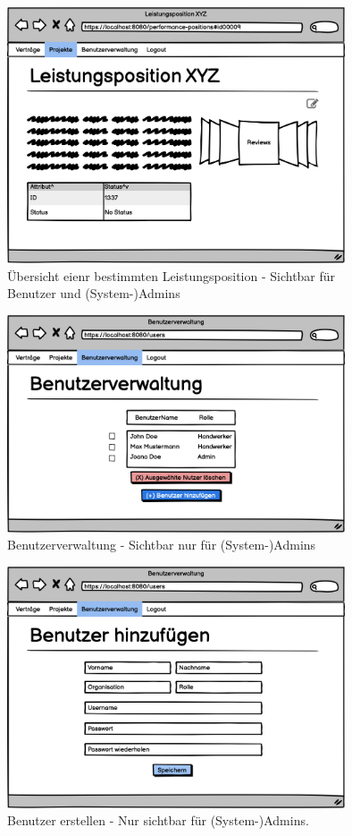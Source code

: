 \begin{figure}[h]
\centering
\includegraphics[width=10cm]{img/mockup_web/admin-und-benutzer-leistungsposition-exmpl.png}
\caption{Übersicht eienr bestimmten Leistungsposition - Sichtbar für Benutzer und (System-)Admins}
\end{figure}

\begin{figure}[h]
\centering
\includegraphics[width=10cm]{img/mockup_web/admin-und-benutzer-benutzerverwaltung.png}
\caption{Benutzerverwaltung - Sichtbar nur für (System-)Admins}
\end{figure}

\begin{figure}[h]
\centering
\includegraphics[width=10cm]{img/mockup_web/admin-und-benutzer-erstellen.png}
\caption{Benutzer erstellen - Nur sichtbar für (System-)Admins.}
\end{figure}